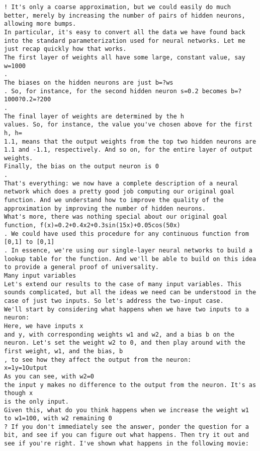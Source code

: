 \begin{lstlisting}
! It's only a coarse approximation, but we could easily do much better, merely by increasing the number of pairs of hidden neurons, allowing more bumps.
In particular, it's easy to convert all the data we have found back into the standard parameterization used for neural networks. Let me just recap quickly how that works.
The first layer of weights all have some large, constant value, say w=1000
.
The biases on the hidden neurons are just b=?ws
. So, for instance, for the second hidden neuron s=0.2 becomes b=?1000?0.2=?200
.
The final layer of weights are determined by the h
values. So, for instance, the value you've chosen above for the first h, h=
1.1, means that the output weights from the top two hidden neurons are 1.1 and -1.1, respectively. And so on, for the entire layer of output weights.
Finally, the bias on the output neuron is 0
.
That's everything: we now have a complete description of a neural network which does a pretty good job computing our original goal function. And we understand how to improve the quality of the approximation by improving the number of hidden neurons.
What's more, there was nothing special about our original goal function, f(x)=0.2+0.4x2+0.3sin(15x)+0.05cos(50x)
. We could have used this procedure for any continuous function from [0,1] to [0,1]
. In essence, we're using our single-layer neural networks to build a lookup table for the function. And we'll be able to build on this idea to provide a general proof of universality.
Many input variables
Let's extend our results to the case of many input variables. This sounds complicated, but all the ideas we need can be understood in the case of just two inputs. So let's address the two-input case.
We'll start by considering what happens when we have two inputs to a neuron:
Here, we have inputs x
and y, with corresponding weights w1 and w2, and a bias b on the neuron. Let's set the weight w2 to 0, and then play around with the first weight, w1, and the bias, b
, to see how they affect the output from the neuron:
x=1y=1Output
As you can see, with w2=0
the input y makes no difference to the output from the neuron. It's as though x
is the only input.
Given this, what do you think happens when we increase the weight w1
to w1=100, with w2 remaining 0
? If you don't immediately see the answer, ponder the question for a bit, and see if you can figure out what happens. Then try it out and see if you're right. I've shown what happens in the following movie:


\end{lstlisting}
